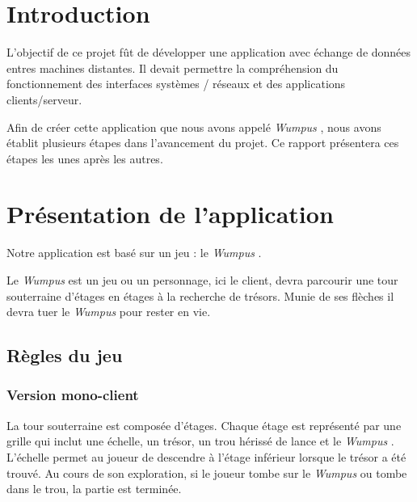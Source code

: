 \documentclass[a4paper,10pt]{article}
\newcommand{\gameName}{\emph{Wumpus }}
\begin{document}
	\newpage
	\tableofcontents

	\newpage
	\pagestyle{fancy}

	\section{Introduction}
L'objectif de ce projet fût de développer une application avec échange de données entres machines distantes. Il devait permettre la compréhension du fonctionnement des interfaces systèmes / réseaux et des applications clients/serveur.

	Afin de créer cette application que nous avons appelé \gameName, nous avons établit plusieurs étapes dans l'avancement du projet. Ce rapport
	présentera  ces étapes  les unes après  les autres.


	\newpage
	\section{Présentation de l'application}
	Notre application est basé sur un jeu : le \gameName.

	Le \gameName est un jeu ou un personnage, ici le client, devra parcourir une tour souterraine d'étages en étages à la recherche de trésors. %
	Munie de ses flèches il devra tuer le \gameName pour rester en vie.

	\subsection{Règles du jeu}
		\subsubsection{Version mono-client}
			La tour souterraine est composée d'étages.
			Chaque étage est représenté par une grille qui inclut une échelle, un trésor, un trou hérissé de lance et le \gameName.
			L'échelle permet au joueur de descendre à l'étage inférieur lorsque le trésor a été trouvé. Au cours de son exploration, si le joueur tombe sur le
	\gameName ou tombe dans le trou, la partie est terminée.
\end{document}
